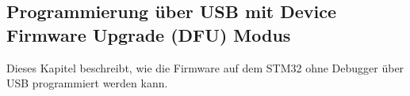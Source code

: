 \subsection{Programmierung über USB mit Device Firmware Upgrade (DFU) Modus}
\label{sec:USBDFU}

Dieses Kapitel beschreibt, wie die Firmware auf dem STM32 ohne Debugger über USB programmiert werden kann.

